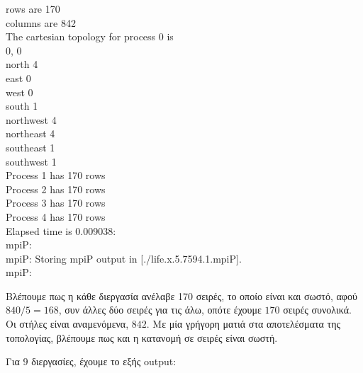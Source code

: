 \begin{tcolorbox}
rows are 170 \\
columns are 842 \\

The cartesian topology for process 0 is \\
0, 0 \\
north 4 \\
east 0 \\
west 0 \\
south 1 \\
northwest 4 \\
northeast 4 \\
southeast 1 \\
southwest 1 \\

Process 1 has 170 rows \\
Process 2 has 170 rows \\
Process 3 has 170 rows \\
Process 4 has 170 rows \\
Elapsed time is 0.009038: \\
mpiP: \\
mpiP: Storing mpiP output in [./life.x.5.7594.1.mpiP]. \\
mpiP: \\
\end{tcolorbox}

Βλέπουμε πως η κάθε διεργασία ανέλαβε 170 σειρές, το οποίο είναι και σωστό, αφού $840 / 5 = 168$, συν άλλες δύο σειρές για τις άλω, οπότε έχουμε $170$ σειρές συνολικά. Οι στήλες είναι αναμενόμενα, $842$. Με μία γρήγορη ματιά στα αποτελέσματα της τοπολογίας, βλέπουμε πως και η κατανομή σε σειρές είναι σωστή. \par
Για $9$ διεργασίες, έχουμε το εξής output:

